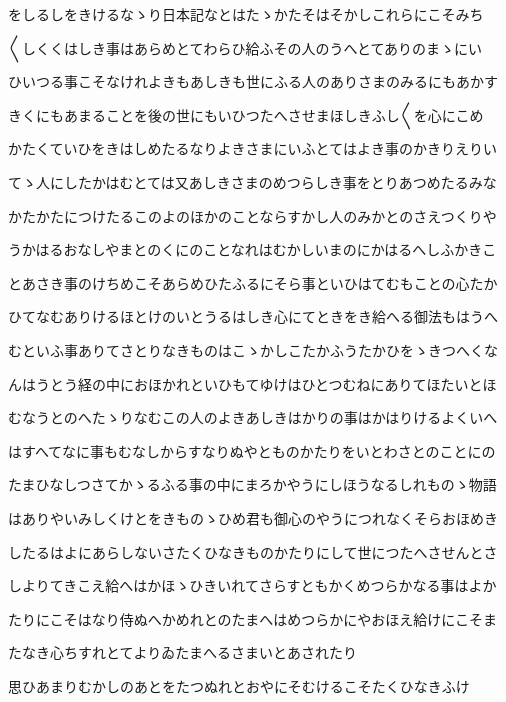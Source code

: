 \documentclass[a4paper,11pt,landscape]{ltjtarticle}
\begin{document}
\par\medskip
をしるしをきけるなゝり日本記なとはたゝかたそはそかしこれらにこそみち
\par\medskip
〱しくくはしき事はあらめとてわらひ給ふその人のうへとてありのまゝにい
\par\medskip
ひいつる事こそなけれよきもあしきも世にふる人のありさまのみるにもあかす
\par\medskip
きくにもあまることを後の世にもいひつたへさせまほしきふし〱を心にこめ
\par\medskip
かたくていひをきはしめたるなりよきさまにいふとてはよき事のかきりえりい
\par\medskip
てゝ人にしたかはむとては又あしきさまのめつらしき事をとりあつめたるみな
\par\medskip
かたかたにつけたるこのよのほかのことならすかし人のみかとのさえつくりや
\par\medskip
うかはるおなしやまとのくにのことなれはむかしいまのにかはるへしふかきこ
\par\medskip
とあさき事のけちめこそあらめひたふるにそら事といひはてむもことの心たか
\par\medskip
ひてなむありけるほとけのいとうるはしき心にてときをき給へる御法もはうへ
\par\medskip
むといふ事ありてさとりなきものはこゝかしこたかふうたかひをゝきつへくな
\par\medskip
んはうとう経の中におほかれといひもてゆけはひとつむねにありてほたいとほ
\par\medskip
むなうとのへたゝりなむこの人のよきあしきはかりの事はかはりけるよくいへ
\par\medskip
はすへてなに事もむなしからすなりぬやとものかたりをいとわさとのことにの
\par\medskip
たまひなしつさてかゝるふる事の中にまろかやうにしほうなるしれものゝ物語
\par\medskip
はありやいみしくけとをきものゝひめ君も御心のやうにつれなくそらおほめき
\par\medskip
したるはよにあらしないさたくひなきものかたりにして世につたへさせんとさ
\par\medskip
しよりてきこえ給へはかほゝひきいれてさらすともかくめつらかなる事はよか
\par\medskip
たりにこそはなり侍ぬへかめれとのたまへはめつらかにやおほえ給けにこそま
\par\medskip
たなき心ちすれとてよりゐたまへるさまいとあされたり
\par\medskip
思ひあまりむかしのあとをたつぬれとおやにそむけるこそたくひなきふけ
\par\medskip
\end{document}
